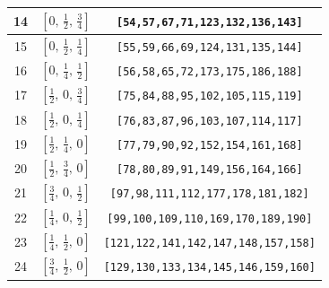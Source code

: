\documentclass[fleqn,8pt]{jsarticle}
\begin{document}
\begin{longtable}{ccc}
14 & $\left[ 0,\, \frac{1}{2},\, \frac{3}{4} \right]$ & {\tt [54,57,67,71,123,132,136,143]} \\ \hline
15 & $\left[ 0,\, \frac{1}{2},\, \frac{1}{4} \right]$ & {\tt [55,59,66,69,124,131,135,144]} \\ \hline
16 & $\left[ 0,\, \frac{1}{4},\, \frac{1}{2} \right]$ & {\tt [56,58,65,72,173,175,186,188]} \\ \hline
17 & $\left[ \frac{1}{2},\, 0,\, \frac{3}{4} \right]$ & {\tt [75,84,88,95,102,105,115,119]} \\ \hline
18 & $\left[ \frac{1}{2},\, 0,\, \frac{1}{4} \right]$ & {\tt [76,83,87,96,103,107,114,117]} \\ \hline
19 & $\left[ \frac{1}{2},\, \frac{1}{4},\, 0 \right]$ & {\tt [77,79,90,92,152,154,161,168]} \\ \hline
20 & $\left[ \frac{1}{2},\, \frac{3}{4},\, 0 \right]$ & {\tt [78,80,89,91,149,156,164,166]} \\ \hline
21 & $\left[ \frac{3}{4},\, 0,\, \frac{1}{2} \right]$ & {\tt [97,98,111,112,177,178,181,182]} \\ \hline
22 & $\left[ \frac{1}{4},\, 0,\, \frac{1}{2} \right]$ & {\tt [99,100,109,110,169,170,189,190]} \\ \hline
23 & $\left[ \frac{1}{4},\, \frac{1}{2},\, 0 \right]$ & {\tt [121,122,141,142,147,148,157,158]} \\ \hline
24 & $\left[ \frac{3}{4},\, \frac{1}{2},\, 0 \right]$ & {\tt [129,130,133,134,145,146,159,160]} \\
\end{longtable}
\renewcommand{\arraystretch}{1.2}
\end{document}
